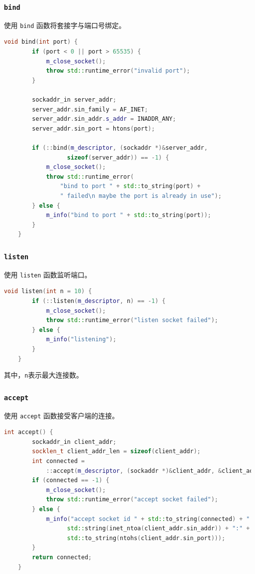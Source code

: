 \documentclass{article}
\begin{document}
\subsubsection{\texttt{bind}}

使用 \texttt{bind} 函数将套接字与端口号绑定。

\begin{lstlisting}[language=C++, title=bind]
    void bind(int port) {
        if (port < 0 || port > 65535) {
            m_close_socket();
            throw std::runtime_error("invalid port");
        }

        sockaddr_in server_addr;
        server_addr.sin_family = AF_INET;
        server_addr.sin_addr.s_addr = INADDR_ANY;
        server_addr.sin_port = htons(port);

        if (::bind(m_descriptor, (sockaddr *)&server_addr,
                  sizeof(server_addr)) == -1) {
            m_close_socket();
            throw std::runtime_error(
                "bind to port " + std::to_string(port) +
                " failed\n maybe the port is already in use");
        } else {
            m_info("bind to port " + std::to_string(port));
        }
    }
\end{lstlisting}

\subsubsection{\texttt{listen}}

使用 \texttt{listen} 函数监听端口。

\begin{lstlisting}[language=C++, title=listen]
    void listen(int n = 10) {
        if (::listen(m_descriptor, n) == -1) {
            m_close_socket();
            throw std::runtime_error("listen socket failed");
        } else {
            m_info("listening");
        }
    }
\end{lstlisting}

其中，\texttt{n}表示最大连接数。

\subsubsection{\texttt{accept}}

使用 \texttt{accept} 函数接受客户端的连接。

\begin{lstlisting}[language=C++, title=accept]
    int accept() {
        sockaddr_in client_addr;
        socklen_t client_addr_len = sizeof(client_addr);
        int connected =
            ::accept(m_descriptor, (sockaddr *)&client_addr, &client_addr_len);
        if (connected == -1) {
            m_close_socket();
            throw std::runtime_error("accept socket failed");
        } else {
            m_info("accept socket id " + std::to_string(connected) + " from " +
                  std::string(inet_ntoa(client_addr.sin_addr)) + ":" +
                  std::to_string(ntohs(client_addr.sin_port)));
        }
        return connected;
    }
\end{lstlisting}
\end{document}

